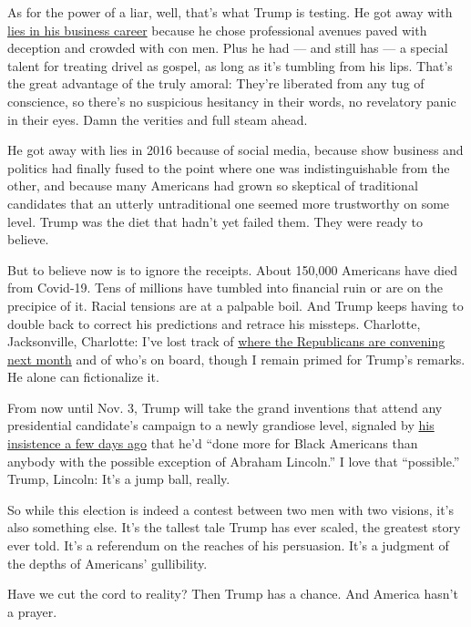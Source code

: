 As for the power of a liar, well, that's what Trump is testing. He got
away with
\href{https://www.nytimes.com/2016/07/17/us/politics/donald-trump-business.html}{lies
in his business career} because he chose professional avenues paved with
deception and crowded with con men. Plus he had --- and still has --- a
special talent for treating drivel as gospel, as long as it's tumbling
from his lips. That's the great advantage of the truly amoral: They're
liberated from any tug of conscience, so there's no suspicious hesitancy
in their words, no revelatory panic in their eyes. Damn the verities and
full steam ahead.

He got away with lies in 2016 because of social media, because show
business and politics had finally fused to the point where one was
indistinguishable from the other, and because many Americans had grown
so skeptical of traditional candidates that an utterly untraditional one
seemed more trustworthy on some level. Trump was the diet that hadn't
yet failed them. They were ready to believe.

But to believe now is to ignore the receipts. About 150,000 Americans
have died from Covid-19. Tens of millions have tumbled into financial
ruin or are on the precipice of it. Racial tensions are at a palpable
boil. And Trump keeps having to double back to correct his predictions
and retrace his missteps. Charlotte, Jacksonville, Charlotte: I've lost
track of
\href{https://www.cnn.com/2020/07/23/politics/rnc-jacksonville/index.html}{where
the Republicans are convening next month} and of who's on board, though
I remain primed for Trump's remarks. He alone can fictionalize it.

From now until Nov. 3, Trump will take the grand inventions that attend
any presidential candidate's campaign to a newly grandiose level,
signaled by
\href{https://www.whitehouse.gov/briefings-statements/remarks-president-trump-press-briefing-072220/}{his
insistence a few days ago} that he'd ``done more for Black Americans
than anybody with the possible exception of Abraham Lincoln.'' I love
that ``possible.'' Trump, Lincoln: It's a jump ball, really.

So while this election is indeed a contest between two men with two
visions, it's also something else. It's the tallest tale Trump has ever
scaled, the greatest story ever told. It's a referendum on the reaches
of his persuasion. It's a judgment of the depths of Americans'
gullibility.

Have we cut the cord to reality? Then Trump has a chance. And America
hasn't a prayer.

